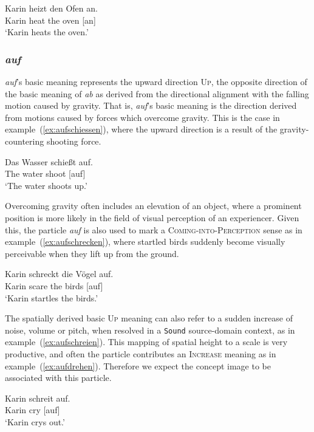 \documentclass[output=paper]{langsci/langscibook}
\begin{document}
\ea\label{ex:anheizen}
\gll Karin heizt den Ofen an.\\
Karin heat the oven [an]\\
\glt `Karin heats the oven.'
\z

\vspace{+1mm}
\subsubsection{\textit{auf}}

\textit{auf}'s basic meaning represents the upward direction
\textsc{Up}, the opposite direction of the basic meaning of
\textit{ab} as derived from the directional alignment with the falling
motion caused by gravity. That is, \textit{auf}'s basic meaning is the
direction derived from motions caused by forces which overcome
gravity. This is the case in example~(\ref{ex:aufschiessen}), where
the upward direction is a result of the gravity-countering shooting
force.

\ea\label{ex:aufschiessen}
\gll Das Wasser schießt auf.\\
The water shoot [auf]\\
\glt `The water shoots up.'
\z

Overcoming gravity often includes an elevation of an object, where a
prominent position is more likely in the field of visual perception of
an experiencer. Given this, the particle \textit{auf} is also used to
mark a \textsc{Coming-into-Perception} sense as in
example~(\ref{ex:aufschrecken}), where startled birds suddenly become
visually perceivable when they lift up from the ground.

\ea\label{ex:aufschrecken}
\gll Karin schreckt die Vögel auf.\\
Karin scare the birds [auf]\\
\glt `Karin startles the birds.'
\z

The spatially derived basic \textsc{Up} meaning can also refer to a
sudden increase of noise, volume or pitch, when resolved in a
\texttt{Sound} source-domain context, as in
example~(\ref{ex:aufschreien}). This mapping of spatial height to a
scale is very productive, and often the particle contributes an
\textsc{Increase} meaning as in
example~(\ref{ex:aufdrehen}). Therefore we expect the concept image
 to be associated with this particle.

\ea\label{ex:aufschreien}
\gll Karin schreit auf.\\
Karin cry [auf]\\
\glt `Karin crys out.'
\z
\end{document}
